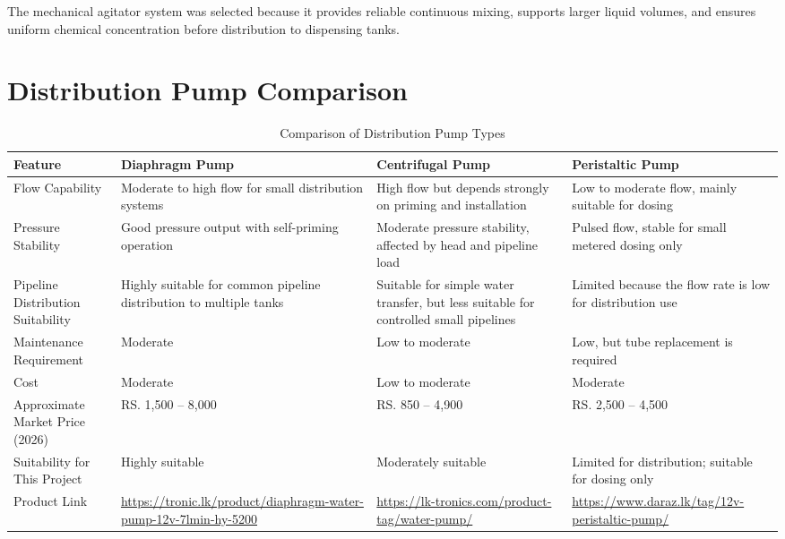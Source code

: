\documentclass[12pt,a4paper]{report}
\begin{document}
The mechanical agitator system was selected because it provides reliable continuous mixing, supports larger liquid volumes, and ensures uniform chemical concentration before distribution to dispensing tanks.

\section{Distribution Pump Comparison}

\begin{table}[H]
\centering
\small
\begin{tabularx}{\textwidth}{|p{3cm}|>{\raggedright\arraybackslash}X|>{\raggedright\arraybackslash}X|>{\raggedright\arraybackslash}X|}
\hline
\textbf{Feature} & \textbf{Diaphragm Pump} & \textbf{Centrifugal Pump} & \textbf{Peristaltic Pump} \\
\hline

Flow Capability &
Moderate to high flow for small distribution systems &
High flow but depends strongly on priming and installation &
Low to moderate flow, mainly suitable for dosing \\
\hline

Pressure Stability &
Good pressure output with self-priming operation &
Moderate pressure stability, affected by head and pipeline load &
Pulsed flow, stable for small metered dosing only \\
\hline

Pipeline Distribution Suitability &
Highly suitable for common pipeline distribution to multiple tanks &
Suitable for simple water transfer, but less suitable for controlled small pipelines &
Limited because the flow rate is low for distribution use \\
\hline

Maintenance Requirement &
Moderate &
Low to moderate &
Low, but tube replacement is required \\
\hline

Cost &
Moderate &
Low to moderate &
Moderate \\
\hline

Approximate Market Price (2026) &
RS. 1,500 -- 8,000 &
RS. 850 -- 4,900 &
RS. 2,500 -- 4,500 \\
\hline

Suitability for This Project &
Highly suitable &
Moderately suitable &
Limited for distribution; suitable for dosing only \\
\hline

Product Link &
\url{https://tronic.lk/product/diaphragm-water-pump-12v-7lmin-hy-5200} &
\url{https://lk-tronics.com/product-tag/water-pump/} &
\url{https://www.daraz.lk/tag/12v-peristaltic-pump/} \\
\hline

\end{tabularx}
\caption{Comparison of Distribution Pump Types}
\end{table}
\end{document}
